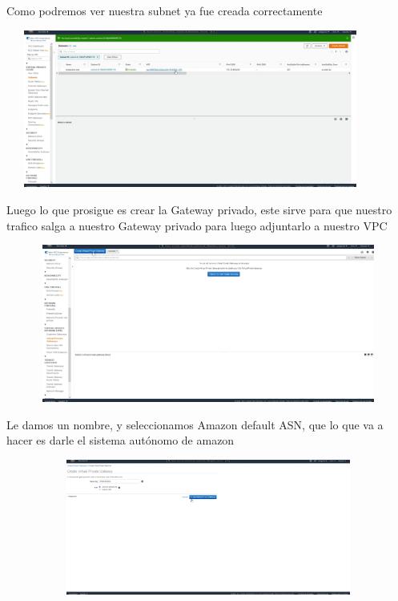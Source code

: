 \documentclass{article} %
\begin{document}
\noindent Como podremos ver nuestra subnet ya fue creada correctamente

\noindent 

\noindent \includegraphics*[width=4.78in, height=2.04in, trim=1.29in 4.28in 7.67in 0.12in]{image8}

\noindent 

\noindent Luego lo que prosigue es crear la Gateway privado, este sirve para que nuestro trafico salga a nuestro Gateway privado para luego adjuntarlo a nuestro VPC

\noindent 

\noindent 

\noindent 

\noindent \includegraphics*[width=5.75in, height=2.04in, trim=0.00in 6.50in 12.29in 0.00in]{image9}

\noindent 

\noindent Le damos un nombre, y seleccionamos Amazon default ASN, que lo que va a hacer es darle el sistema aut\'{o}nomo de amazon

\noindent 

\noindent \includegraphics*[width=6.21in, height=1.75in, trim=0.00in 3.32in 4.49in 0.00in]{image10}
\end{document}
